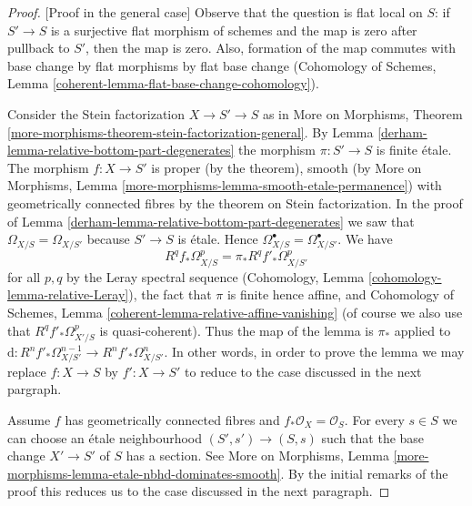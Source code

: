 \begin{proof}
[Proof in the general case]
Observe that the question is flat local on $S$: if $S' \to S$ is a surjective
flat morphism of schemes and the map is zero after pullback to $S'$,
then the map is zero. Also, formation of the map commutes with base change
by flat morphisms by flat base change (Cohomology of Schemes, Lemma
\ref{coherent-lemma-flat-base-change-cohomology}).

\medskip\noindent
Consider the Stein factorization $X \to S' \to S$ as in
More on Morphisms, Theorem
\ref{more-morphisms-theorem-stein-factorization-general}.
By Lemma \ref{derham-lemma-relative-bottom-part-degenerates} the morphism
$\pi : S' \to S$ is finite \'etale.
The morphism $f : X \to S'$ is proper (by the theorem),
smooth (by More on Morphisms, Lemma
\ref{more-morphisms-lemma-smooth-etale-permanence}) with geometrically
connected fibres by the theorem on Stein factorization.
In the proof of Lemma \ref{derham-lemma-relative-bottom-part-degenerates}
we saw that $\Omega_{X/S} = \Omega_{X/S'}$ because $S' \to S$ is \'etale.
Hence $\Omega^\bullet_{X/S} = \Omega^\bullet_{X/S'}$.
We have
$$
R^qf_*\Omega^p_{X/S} = \pi_*R^qf'_*\Omega^p_{X/S'}
$$
for all $p, q$ by the Leray spectral sequence
(Cohomology, Lemma \ref{cohomology-lemma-relative-Leray}),
the fact that $\pi$ is finite hence affine, and
Cohomology of Schemes, Lemma \ref{coherent-lemma-relative-affine-vanishing}
(of course we also use that $R^qf'_*\Omega^p_{X'/S}$ is
quasi-coherent).
Thus the map of the lemma is $\pi_*$ applied to
$\text{d} : R^nf'_*\Omega^{n - 1}_{X/S'} \to R^nf'_*\Omega^n_{X/S'}$.
In other words, in order to prove the lemma we may replace
$f : X \to S$ by $f' : X \to S'$ to reduce to the case discussed
in the next pargraph.

\medskip\noindent
Assume $f$ has geometrically connected fibres and
$f_*\mathcal{O}_X = \mathcal{O}_S$.
For every $s \in S$ we can choose an \'etale neighbourhood
$(S', s') \to (S, s)$ such that the base change $X' \to S'$ of $S$
has a section. See More on Morphisms, Lemma
\ref{more-morphisms-lemma-etale-nbhd-dominates-smooth}.
By the initial remarks of the proof this reduces us to the case
discussed in the next paragraph.


\end{proof}
